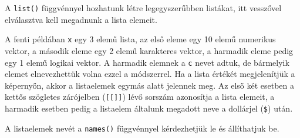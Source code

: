\documentclass[
]{book}
\newenvironment{Shaded}{\begin{snugshade}}{\end{snugshade}}
\newcommand{\AttributeTok}[1]{\textcolor[rgb]{0.77,0.63,0.00}{#1}}
\newcommand{\CommentTok}[1]{\textcolor[rgb]{0.56,0.35,0.01}{\textit{#1}}}
\newcommand{\DecValTok}[1]{\textcolor[rgb]{0.00,0.00,0.81}{#1}}
\newcommand{\FunctionTok}[1]{\textcolor[rgb]{0.00,0.00,0.00}{#1}}
\newcommand{\NormalTok}[1]{#1}
\newcommand{\OtherTok}[1]{\textcolor[rgb]{0.56,0.35,0.01}{#1}}
\newcommand{\SpecialCharTok}[1]{\textcolor[rgb]{0.00,0.00,0.00}{#1}}
\newcommand{\StringTok}[1]{\textcolor[rgb]{0.31,0.60,0.02}{#1}}
\begin{document}
A \texttt{list()} függvénnyel hozhatunk létre legegyszerűbben listákat, itt vesszővel elválasztva kell megadnunk a lista elemeit.

\begin{Shaded}
\end{Shaded}

A fenti példában \texttt{x} egy 3 elemű lista, az első eleme egy 10 elemű numerikus vektor, a második eleme egy 2 elemű karakteres vektor, a harmadik eleme pedig egy 1 elemű logikai vektor. A harmadik elemnek a \texttt{c} nevet adtuk, de bármelyik elemet elnevezhettük volna ezzel a módszerrel. Ha a lista értékét megjelenítjük a képernyőn, akkor a listaelemek egymás alatt jelennek meg. Az első két esetben a kettős szögletes zárójelben (\texttt{{[}{[}{]}{]}}) lévő sorszám azonosítja a lista elemeit, a harmadik esetben pedig a listaelem általunk megadott neve a dollárjel (\texttt{\$}) után.

A listaelemek nevét a \texttt{names()} függvénnyel kérdezhetjük le és állíthatjuk be.

\begin{Shaded}
\end{Shaded}
\end{document}
